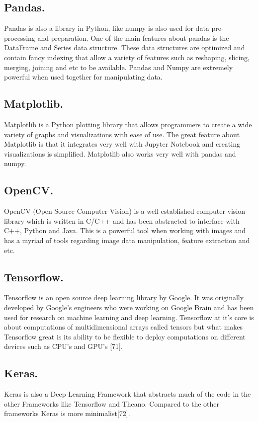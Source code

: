 \documentclass[11pt]{report}
\begin{document}
\subsection{Pandas.}
Pandas is also a library in Python, like numpy is also used for data pre-processing and preparation. One
of the main features about pandas is the DataFrame and Series data structure. These data structures are
optimized and contain fancy indexing that allow a variety of features such as reshaping, slicing, merging,
joining and etc to be available.
Pandas and Numpy are extremely powerful when used together for manipulating data.\\

\subsection{Matplotlib.}
Matplotlib is a Python plotting library that allows programmers to create a wide variety of graphs and
visualizations with ease of use. The great feature about Matplotlib is that it integrates very well with
Jupyter Notebook and creating visualizations is simplified. Matplotlib also works very well with pandas and
numpy.\\

\subsection{OpenCV.}
OpenCV (Open Source Computer Vision) is a well established computer vision library which is written in
C/C++ and has been abstracted to interface with C++, Python and Java. This is a powerful tool when
working with images and has a myriad of tools regarding image data manipulation, feature extraction and
etc.\\

\subsection{Tensorflow.}
Tensorflow is an open source deep learning library by Google. It was originally developed by Google’s
engineers who were working on Google Brain and has been used for research on machine learning and deep
learning. Tensorflow at it’s core is about computations of multidimensional arrays called tensors but what
makes Tensorflow great is its ability to be flexible to deploy computations on different devices such as CPU’s
and GPU’s [71].\\

\subsection{Keras.}
Keras is also a Deep Learning Framework that abstracts much of the code in the other Frameworks like
Tensorflow and Theano. Compared to the other frameworks Keras is more minimalist[72].\\
\end{document}
